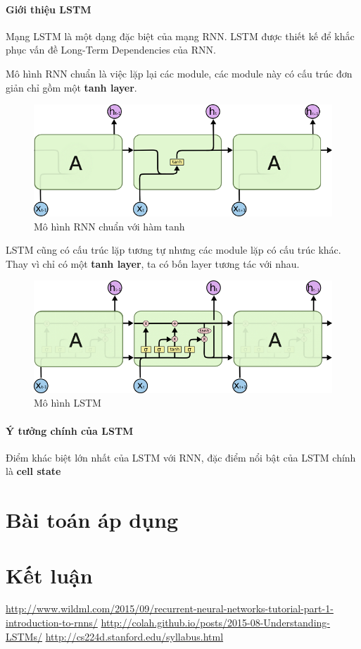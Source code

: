 \documentclass[a4paper,12pt]{report}
\begin{document}
\subsubsection{Giới thiệu LSTM}
Mạng LSTM là một dạng đặc biệt của mạng RNN. LSTM được thiết kế để khắc phục vấn đề Long-Term Dependencies của RNN. 
\par Mô hình RNN chuẩn là việc lặp lại các module, các module này có cấu trúc đơn giản chỉ gồm một \textbf{tanh layer}.
\begin{figure}[H]
\centering
\includegraphics[scale=0.7]{rnn_tanh.jpg}
\caption{Mô hình RNN chuẩn với hàm tanh}
\end{figure}
\par LSTM cũng có cấu trúc lặp tương tự nhưng các module lặp có cấu trúc khác. Thay vì chỉ có một \textbf{tanh layer}, ta có bốn layer tương tác với nhau. 
\begin{figure}[H]
\centering
\includegraphics[scale=0.4]{lstm.png}
\caption{Mô hình LSTM}
\end{figure} 

\subsubsection{Ý tưởng chính của LSTM}
Điểm khác biệt lớn nhất của LSTM với RNN, đặc điểm nổi bật của LSTM chính là \textbf{cell state}	



\chapter{Bài toán áp dụng}


\chapter{Kết luận} 
\begin{thebibliography}{9}
 \url{http://www.wildml.com/2015/09/recurrent-neural-networks-tutorial-part-1-introduction-to-rnns/}
 \url{http://colah.github.io/posts/2015-08-Understanding-LSTMs/}
 \url{http://cs224d.stanford.edu/syllabus.html}
\end{thebibliography}
\end{document}
